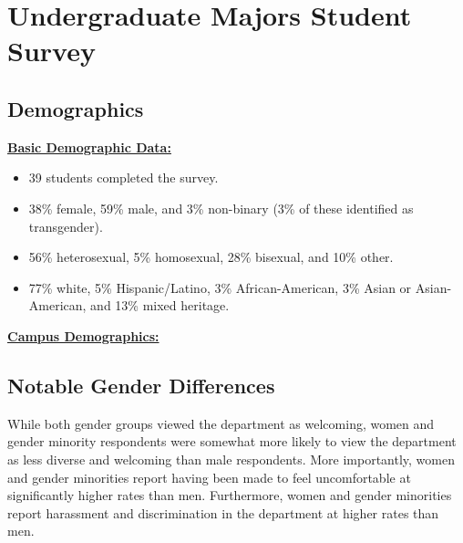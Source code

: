 \documentclass[oneside]{book}   %
\begin{document}
\chapter{Undergraduate Majors Student Survey}
\label{ch:majors}
\section{Demographics}
\noindent\underline{\textbf{Basic Demographic Data:}}
\begin{itemize}
	\item 39 students completed the survey.
	\item 38\% female, 59\% male, and 3\% non-binary (3\% of these identified as transgender).
	\item 56\% heterosexual, 5\% homosexual, 28\% bisexual, and 10\% other.
	\item 77\% white, 5\% Hispanic/Latino, 3\% African-American, 3\% Asian or Asian-American, and 13\% mixed heritage.
\end{itemize}
\underline{\textbf{Campus Demographics:}}


\section{Notable Gender Differences}

\indent While both gender groups viewed the department as welcoming, women and gender minority respondents were somewhat more likely to view the department as less diverse and welcoming than male respondents. More importantly, women and gender minorities report having been made to feel uncomfortable at significantly higher rates than men. Furthermore, women and gender minorities report harassment and discrimination in the department at higher rates than men.

\end{document}
